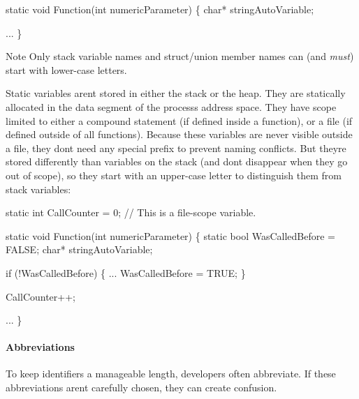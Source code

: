 \begin{DoxyCode}
\textcolor{keyword}{static} \textcolor{keywordtype}{void} Function(\textcolor{keywordtype}{int} numericParameter)
\{
    \textcolor{keywordtype}{char}* stringAutoVariable;


    ...
\}
\end{DoxyCode}


\begin{DoxyNote}{Note}
Only stack variable names and struct/union member names can (and {\itshape must}) start with lower-\/case letters.
\end{DoxyNote}
Static variables aren\textquotesingle{}t stored in either the stack or the heap. They are statically allocated in the data segment of the process\textquotesingle{}s address space. They have scope limited to either a compound statement (if defined inside a function), or a file (if defined outside of all functions). Because these variables are never visible outside a file, they don\textquotesingle{}t need any special prefix to prevent naming conflicts. But they\textquotesingle{}re stored differently than variables on the stack (and don\textquotesingle{}t disappear when they go out of scope), so they start with an upper-\/case letter to distinguish them from stack variables\+:


\begin{DoxyCode}
\textcolor{keyword}{static} \textcolor{keywordtype}{int} CallCounter = 0;  \textcolor{comment}{// This is a file-scope variable.}

\textcolor{keyword}{static} \textcolor{keywordtype}{void} Function(\textcolor{keywordtype}{int} numericParameter)
\{
    \textcolor{keyword}{static} \textcolor{keywordtype}{bool} WasCalledBefore = FALSE;
    \textcolor{keywordtype}{char}* stringAutoVariable;

    \textcolor{keywordflow}{if} (!WasCalledBefore)
    \{
        ...
        WasCalledBefore = TRUE;
    \}

    CallCounter++;

    ...
\}
\end{DoxyCode}
\hypertarget{ccoding_stds_param_cstdsparamAbbreviations}{}\paragraph{Abbreviations}\label{ccoding_stds_param_cstdsparamAbbreviations}
To keep identifiers a manageable length, developers often abbreviate. If these abbreviations aren\textquotesingle{}t carefully chosen, they can create confusion.

